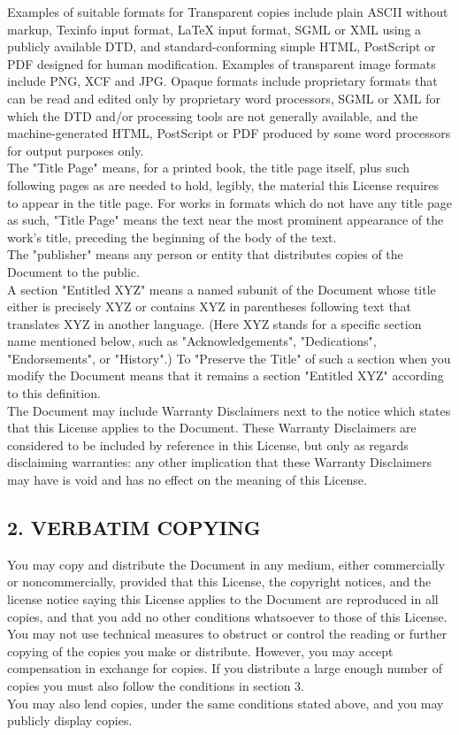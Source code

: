 Examples of suitable formats for Transparent copies include plain ASCII without markup, Texinfo input format, LaTeX input format, SGML or XML using a publicly available DTD, and standard-conforming simple HTML, PostScript or PDF designed for human modification. Examples of transparent image formats include PNG, XCF and JPG. Opaque formats include proprietary formats that can be read and edited only by proprietary word processors, SGML or XML for which the DTD and/or processing tools are not generally available, and the machine-generated HTML, PostScript or PDF produced by some word processors for output purposes only.\\
The "Title Page" means, for a printed book, the title page itself, plus such following pages as are needed to hold, legibly, the material this License requires to appear in the title page. For works in formats which do not have any title page as such, "Title Page" means the text near the most prominent appearance of the work's title, preceding the beginning of the body of the text.\\
The "publisher" means any person or entity that distributes copies of the Document to the public.\\
A section "Entitled XYZ" means a named subunit of the Document whose title either is precisely XYZ or contains XYZ in parentheses following text that translates XYZ in another language. (Here XYZ stands for a specific section name mentioned below, such as "Acknowledgements", "Dedications", "Endorsements", or "History".) To "Preserve the Title" of such a section when you modify the Document means that it remains a section "Entitled XYZ" according to this definition.\\
The Document may include Warranty Disclaimers next to the notice which states that this License applies to the Document. These Warranty Disclaimers are considered to be included by reference in this License, but only as regards disclaiming warranties: any other implication that these Warranty Disclaimers may have is void and has no effect on the meaning of this License.

\subsection{2. VERBATIM COPYING}



You may copy and distribute the Document in any medium, either commercially or noncommercially, provided that this License, the copyright notices, and the license notice saying this License applies to the Document are reproduced in all copies, and that you add no other conditions whatsoever to those of this License. You may not use technical measures to obstruct or control the reading or further copying of the copies you make or distribute. However, you may accept compensation in exchange for copies. If you distribute a large enough number of copies you must also follow the conditions in section 3.\\
You may also lend copies, under the same conditions stated above, and you may publicly display copies.

